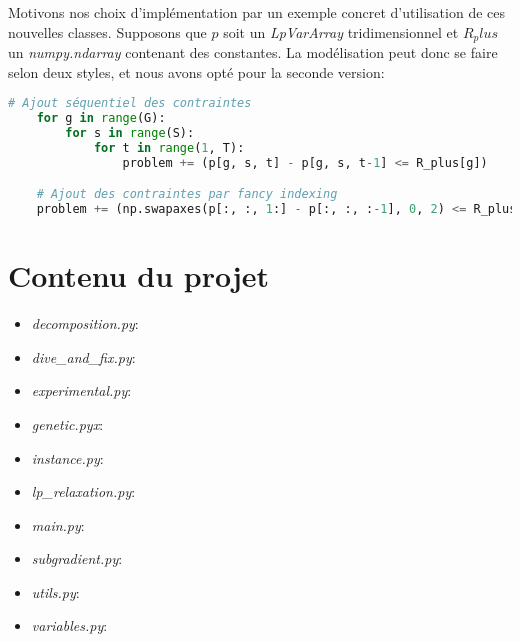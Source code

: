 Motivons nos choix d'implémentation par un exemple concret d'utilisation de ces nouvelles classes.
Supposons que $p$ soit un \textit{LpVarArray} tridimensionnel et $R_plus$ un \textit{numpy.ndarray} contenant 
des constantes. La modélisation peut donc se faire selon deux styles, et nous avons opté pour la seconde
version:
\begin{lstlisting}[language=Python]
    # Ajout séquentiel des contraintes
    for g in range(G):
        for s in range(S):
            for t in range(1, T):
                problem += (p[g, s, t] - p[g, s, t-1] <= R_plus[g])

    # Ajout des contraintes par fancy indexing
    problem += (np.swapaxes(p[:, :, 1:] - p[:, :, :-1], 0, 2) <= R_plus)
\end{lstlisting}

\section{Contenu du projet}

\begin{itemize}
  \item \textit{decomposition.py}: 
  \item \textit{dive\_and\_fix.py}:
  \item \textit{experimental.py}:
  \item \textit{genetic.pyx}:
  \item \textit{instance.py}:
  \item \textit{lp\_relaxation.py}:
  \item \textit{main.py}:
  \item \textit{subgradient.py}:
  \item \textit{utils.py}:
  \item \textit{variables.py}:
\end{itemize}